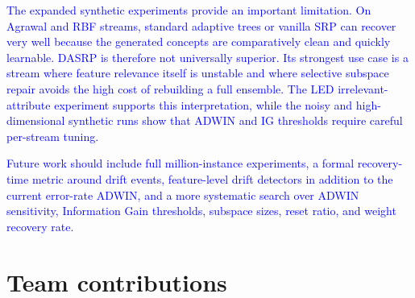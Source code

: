 \documentclass[12pt]{article}
\newcommand{\new}[1]{\textcolor{blue}{#1}}
\begin{document}
\new{The expanded synthetic experiments provide an important limitation. On
Agrawal and RBF streams, standard adaptive trees or vanilla SRP can recover very
well because the generated concepts are comparatively clean and quickly
learnable. DASRP is therefore not universally superior. Its strongest use case
is a stream where feature relevance itself is unstable and where selective
subspace repair avoids the high cost of rebuilding a full ensemble. The LED
irrelevant-attribute experiment supports this interpretation, while the noisy
and high-dimensional synthetic runs show that ADWIN and IG thresholds require
careful per-stream tuning.}

\new{Future work should include full million-instance experiments, a formal
recovery-time metric around drift events, feature-level drift detectors in
addition to the current error-rate ADWIN, and a more systematic search over
ADWIN sensitivity, Information Gain thresholds, subspace sizes, reset ratio, and
weight recovery rate.}

\section{Team contributions}
\label{app:contrib-clean}
\end{document}
